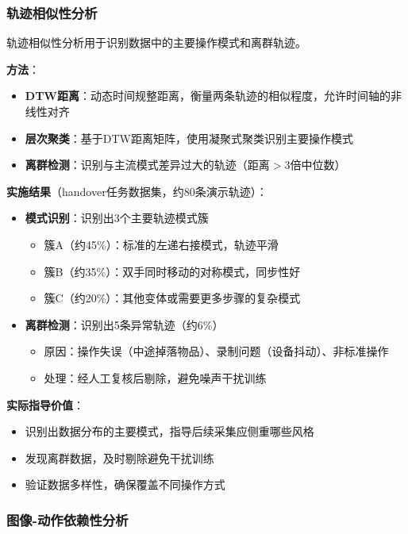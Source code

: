 \subsubsection{轨迹相似性分析}

轨迹相似性分析用于识别数据中的主要操作模式和离群轨迹。

\textbf{方法}：
\begin{itemize}[leftmargin=2em]
    \item \textbf{DTW距离}\cite{berndt1994dtw,mueller2007dtw}：动态时间规整距离，衡量两条轨迹的相似程度，允许时间轴的非线性对齐
    \item \textbf{层次聚类}\cite{schubert2017clustering}：基于DTW距离矩阵，使用凝聚式聚类识别主要操作模式
    \item \textbf{离群检测}：识别与主流模式差异过大的轨迹（距离$>$3倍中位数）
\end{itemize}

\textbf{实施结果}（handover任务数据集，约80条演示轨迹）：
\begin{itemize}[leftmargin=2em]
    \item \textbf{模式识别}：识别出3个主要轨迹模式簇
    \begin{itemize}
        \item 簇A（约45\%）：标准的左递右接模式，轨迹平滑
        \item 簇B（约35\%）：双手同时移动的对称模式，同步性好
        \item 簇C（约20\%）：其他变体或需要更多步骤的复杂模式
    \end{itemize}
    \item \textbf{离群检测}：识别出5条异常轨迹（约6\%）
    \begin{itemize}
        \item 原因：操作失误（中途掉落物品）、录制问题（设备抖动）、非标准操作
        \item 处理：经人工复核后剔除，避免噪声干扰训练
    \end{itemize}
\end{itemize}

\textbf{实际指导价值}：
\begin{itemize}[leftmargin=2em]
    \item 识别出数据分布的主要模式，指导后续采集应侧重哪些风格
    \item 发现离群数据，及时剔除避免干扰训练
    \item 验证数据多样性，确保覆盖不同操作方式
\end{itemize}

\subsubsection{图像-动作依赖性分析}

